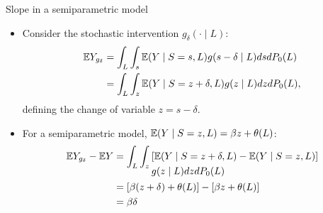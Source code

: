 \documentclass{beamer}
\begin{document}




\begin{frame}[c]{Slope in a semiparametric model}

\begin{center}
\begin{itemize}
  \itemsep8pt
  \item Consider the stochastic intervention $g_{\delta}(\cdot \mid L)$:
    \begin{align*}
      \mathbb{E} Y_{g_{\delta}} &= \int_L \int_s \mathbb{E}(Y \mid S = s, L) g(s - \delta
            \mid L) ds dP_0(L) \\
        &= \int_L \int_z \mathbb{E}(Y \mid S = z + \delta, L) g(z \mid L) dz dP_0(L),
    \end{align*}
      defining the change of variable $z = s - \delta$.
  \item For a semiparametric model, $\mathbb{E} (Y \mid S = z, L) = \beta z +
    \theta(L)$:
    \begin{align*}
      \mathbb{E} Y_{g_{\delta}} - \mathbb{E} Y &= \int_L \int_z
      \begin{aligned}[t]
        & [\mathbb{E}(Y \mid S = z + \delta, L) - \mathbb{E}(Y \mid S = z, L)] \\
        & g(z \mid L) dz dP_0(L)
      \end{aligned} \\
      &= [\beta (z + \delta) + \theta(L)] - [\beta z + \theta(L)] \\
      &= \beta \delta
    \end{align*}
\end{itemize}
\end{center}

\note{
}

\end{frame}
\end{document}
